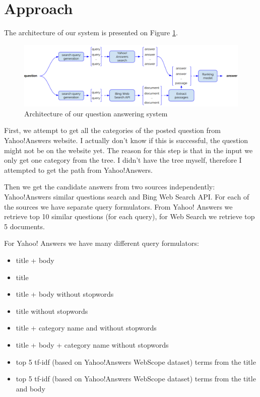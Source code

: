 \documentclass[]{article}
\begin{document}
\section{Approach}

The architecture of our system is presented on Figure \ref{figure:qa_model}.

\begin{figure}
\includegraphics[width=450px]{img/qa_model}
\caption{Architecture of our question answering system}
\label{figure:qa_model}
\end{figure}


First, we attempt to get all the categories of the posted question from Yahoo!Answers website. I actually don't know if this is successful, the question might not be on the website yet. The reason for this step is that in the input we only get one category from the tree. I didn't have the tree myself, therefore I attempted to get the path from Yahoo!Answers.

Then we get the candidate answers from two sources independently: Yahoo!Answers similar questions search and Bing Web Search API.
For each of the sources we have separate query formulators.
From Yahoo! Answers we retrieve top 10 similar questions (for each query), for Web Search we retrieve top 5 documents.

For Yahoo! Answers we have many different query formulators:
\begin{itemize}
\item title + body
\item title
\item title + body without stopwords
\item title without stopwords
\item title + category name and without stopwords
\item title + body + category name without stopwords
\item top 5 tf-idf (based on Yahoo!Answers WebScope dataset) terms from the title
\item top 5 tf-idf (based on Yahoo!Answers WebScope dataset) terms from the title and body
\end{itemize}
\end{document}
